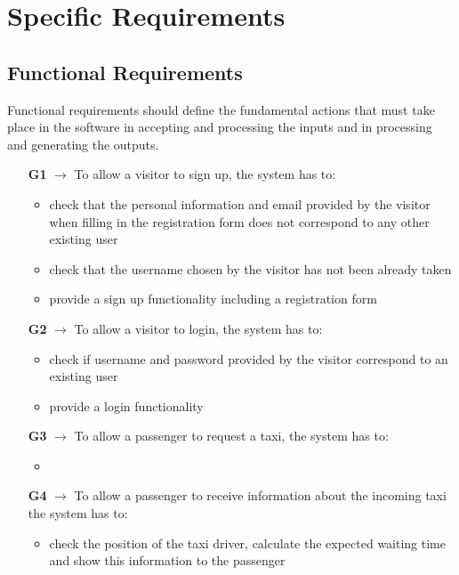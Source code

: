 \chapter{Specific Requirements} \label{chap3}

\section{Functional Requirements}
Functional requirements should define the fundamental actions that must take place in the software in accepting and processing the inputs and in processing and generating the outputs.

\begin{itemize}
	\item [\textbf{G1}] $\rightarrow$ To allow a visitor to sign up, the system has to:
	\begin{itemize}
		\item check that the personal information and email provided by the visitor when filling in the 			registration form does not correspond to any other existing user
		\item check that the username chosen by the visitor has not been already taken
		\item provide a sign up functionality including a registration form 
	\end{itemize}
	
	\item [\textbf{G2}] $\rightarrow$ To allow a visitor to login, the system has to:
	\begin{itemize}
		\item check if username and password provided by the visitor correspond to an existing user
		\item provide a login functionality 
	\end{itemize}
	
	\item [\textbf{G3}] $\rightarrow$ To allow a passenger to request a taxi, the system has to:
	\begin{itemize}
		\item
	\end{itemize}
	
	\item [\textbf{G4}] $\rightarrow$ To allow a passenger to receive information about the incoming taxi the system has to:
	\begin{itemize}
		\item check the position of the taxi driver, calculate the expected waiting time and show this information to the passenger
	\end{itemize}
	

\end{itemize}
